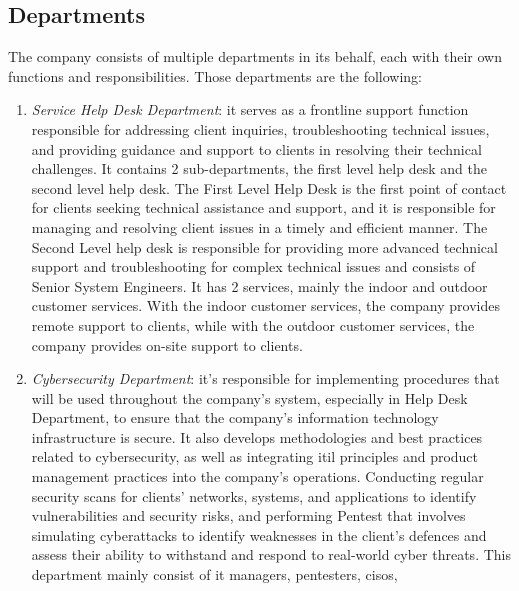 \begin{multicols}{2}
      \subsection{Departments}
      The company consists of multiple departments in its behalf, each with their own functions and responsibilities.
      Those departments are the following:
      \begin{enumerate}
            \item \textit{Service Help Desk Department}: it serves as a frontline support function responsible for
                  addressing client inquiries, troubleshooting technical issues, and providing guidance and support
                  to clients in resolving their technical challenges. It contains 2 sub-departments, the first level
                  help desk and the second level help desk. The First Level Help Desk is the first point of contact
                  for clients seeking technical assistance and support, and it is responsible for managing and
                  resolving client issues in a timely and efficient manner. The Second Level help desk is
                  responsible for providing more advanced technical support and troubleshooting for complex
                  technical issues and consists of Senior System Engineers. It has 2 services, mainly the indoor
                  and outdoor customer services. With the indoor customer services, the company provides remote
                  support to clients, while with the outdoor customer services, the company provides on-site
                  support to clients.
            \item \textit{Cybersecurity Department}: it's responsible for implementing procedures that will be used
                  throughout the company's system, especially in Help Desk Department, to ensure that the company's
                  information technology infrastructure is secure. It also develops methodologies and best practices
                  related to cybersecurity, as well as integrating \acrshort{itil} principles and product management
                  practices into the company's operations. Conducting regular security scans for clients' networks,
                  systems, and applications to identify vulnerabilities and security risks, and performing
                  \gls{Pentest} that involves simulating cyberattacks to identify weaknesses in the client's
                  defences and assess their ability to withstand and respond to real-world cyber threats. This
                  department mainly consist of \acrshort{it} managers, \acrshort{pentest}ers, \acrshort{ciso}s,

\end{enumerate}
\end{multicols}
